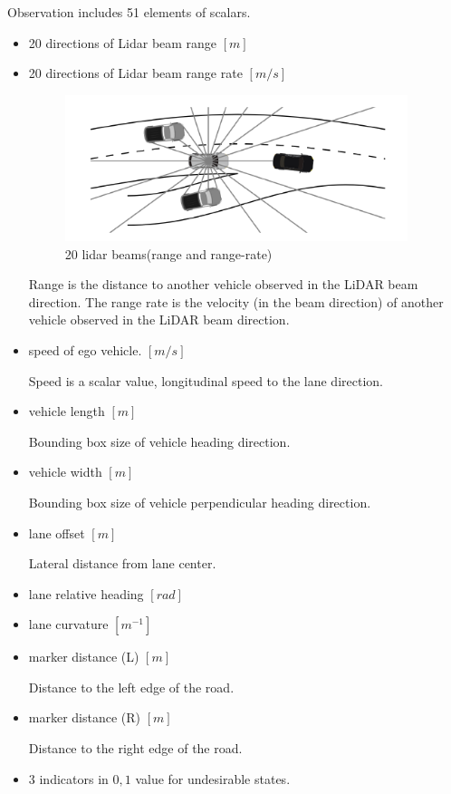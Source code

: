Observation includes 51 elements of scalars.

\begin{itemize}
\item 20 directions of Lidar beam range $[m]$
\item 20 directions of Lidar beam range rate $[m/s]$

\begin{figure}[H]
\begin{center}
\includegraphics[width=10cm]{./figures/lidar_beam.png}
\caption{20 lidar beams(range and range-rate)}
\label{fig:lidar_beam}
\end{center}
\end{figure}

Range is the distance to another vehicle observed in the LiDAR beam direction.
The range rate is the velocity (in the beam direction) of another vehicle observed in the LiDAR beam direction.

\item speed of ego vehicle. $[m/s]$

Speed is a scalar value, longitudinal speed to the lane direction.

\item vehicle length $[m]$

Bounding box size of vehicle heading direction.

\item vehicle width $[m]$

Bounding box size of vehicle perpendicular heading direction.

\item lane offset $[m]$

Lateral distance from lane center.

\item lane relative heading $[rad]$
\item lane curvature $[m^{-1}]$
\item marker distance (L) $[m]$

Distance to the left edge of the road.

\item marker distance (R) $[m]$

Distance to the right edge of the road.

\item 3 indicators in ${0, 1}$ value for undesirable  states.
\end{itemize}

